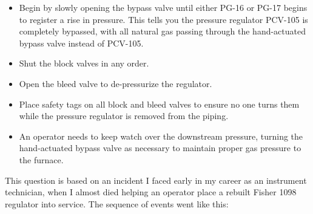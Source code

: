 \begin{itemize}
\item{} Begin by slowly opening the bypass valve until either PG-16 or PG-17 begins to register a rise in pressure.  This tells you the pressure regulator PCV-105 is completely bypassed, with all natural gas passing through the hand-actuated bypass valve instead of PCV-105.
\item{} Shut the block valves in any order.
\item{} Open the bleed valve to de-pressurize the regulator.
\item{} Place safety tags on all block and bleed valves to ensure no one turns them while the pressure regulator is removed from the piping.
\item{} An operator needs to keep watch over the downstream pressure, turning the hand-actuated bypass valve as necessary to maintain proper gas pressure to the furnace.
\end{itemize}







This question is based on an incident I faced early in my career as an instrument technician, when I almost died helping an operator place a rebuilt Fisher 1098 regulator into service.  The sequence of events went like this:

